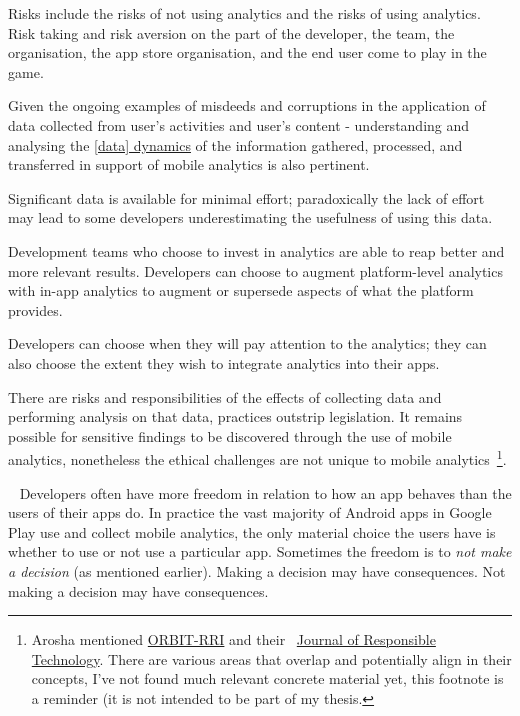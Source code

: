 Risks include the risks of not using analytics and the risks of using analytics. Risk taking and risk aversion on the part of the developer, the team, the organisation, the app store organisation, and the end user come to play in the game.

Given the ongoing examples of misdeeds and corruptions in the application of data collected from user's activities and user's content - understanding and analysing the \href{glossary_data_dynamics}{[data] dynamics} of the information gathered, processed, and transferred in support of mobile analytics is also pertinent.

Significant data is available for minimal effort; paradoxically the lack of effort may lead to some developers underestimating the usefulness of using this data.

Development teams who choose to invest in analytics are able to reap better and more relevant results. Developers can choose to augment platform-level analytics with in-app analytics to augment or supersede aspects of what the platform provides.

Developers can choose when they will pay attention to the analytics; they can also choose the extent they wish to integrate analytics into their apps. 

There are risks and responsibilities of the effects of collecting data and performing analysis on that data, practices outstrip legislation. It remains possible for sensitive findings to be discovered through the use of mobile analytics, nonetheless the ethical challenges are not unique to mobile analytics~\footnote{Arosha mentioned \href{https://www.orbit-rri.org/}{ORBIT-RRI} and their ~\href{https://www.journals.elsevier.com/journal-of-responsible-technology}{Journal of Responsible Technology}. There are various areas that overlap and potentially align in their concepts, I've not found much relevant concrete material yet, this footnote is a reminder (it is not intended to be part of my thesis.}.

~\label{newthought-freedom-and-responsibility}
Developers often have more freedom in relation to how an app behaves than the users of their apps do. In practice the vast majority of Android apps in Google Play use and collect mobile analytics, the only material choice the users have is whether to use or not use a particular app. Sometimes the freedom is to \emph{not make a decision} (as mentioned earlier). Making a decision may have consequences. Not making a decision may have consequences. 

